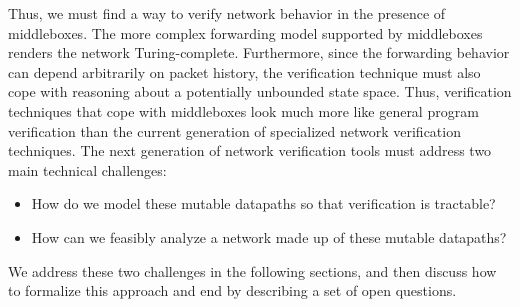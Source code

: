 Thus, we must find a way to verify network behavior in the presence of middleboxes. The more complex forwarding model supported by middleboxes renders the network Turing-complete. Furthermore, since the forwarding behavior can depend arbitrarily on packet history, the verification technique must also cope with reasoning about a potentially unbounded state space. Thus, verification techniques that cope with middleboxes look much more like general program verification than the current generation of specialized network verification techniques. The next generation of network verification tools must address two main technical challenges:
\begin{itemize}
\item How do we model these mutable datapaths so that verification is tractable?
\item How can we feasibly analyze a network made up of these mutable datapaths?
\end{itemize}
We address these two challenges in the following sections, and then discuss  how to formalize this approach and end by describing a set of open questions.
